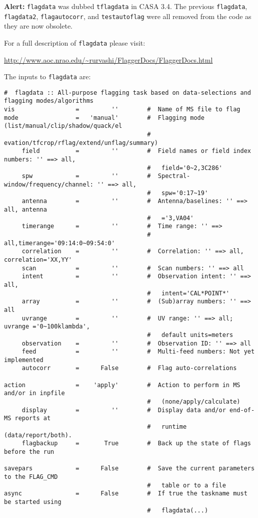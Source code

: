{\bf Alert:} {\tt flagdata} was dubbed {\tt tflagdata} in CASA
3.4. The previous {\tt flagdata}, {\tt flagdata2},
{\tt flagautocorr}, and {\tt testautoflag} were all removed from the
code as they are now obsolete.

For a full description of {\tt flagdata} please visit:

\url{http://www.aoc.nrao.edu/~rurvashi/FlaggerDocs/FlaggerDocs.html}

The inputs to {\tt flagdata} are:

\small
\begin{verbatim}
#  flagdata :: All-purpose flagging task based on data-selections and flagging modes/algorithms
vis                 =         ''        #  Name of MS file to flag
mode                =   'manual'        #  Flagging mode (list/manual/clip/shadow/quack/el
                                        #   evation/tfcrop/rflag/extend/unflag/summary)
     field          =         ''        #  Field names or field index numbers: '' ==> all,
                                        #   field='0~2,3C286'
     spw            =         ''        #  Spectral-window/frequency/channel: '' ==> all,
                                        #   spw='0:17~19'
     antenna        =         ''        #  Antenna/baselines: '' ==> all, antenna
                                        #   ='3,VA04'
     timerange      =         ''        #  Time range: '' ==>
                                        #   all,timerange='09:14:0~09:54:0'
     correlation    =         ''        #  Correlation: '' ==> all, correlation='XX,YY'
     scan           =         ''        #  Scan numbers: '' ==> all
     intent         =         ''        #  Observation intent: '' ==> all,
                                        #   intent='CAL*POINT*'
     array          =         ''        #  (Sub)array numbers: '' ==> all
     uvrange        =         ''        #  UV range: '' ==> all; uvrange ='0~100klambda',
                                        #   default units=meters
     observation    =         ''        #  Observation ID: '' ==> all
     feed           =         ''        #  Multi-feed numbers: Not yet implemented
     autocorr       =      False        #  Flag auto-correlations

action              =    'apply'        #  Action to perform in MS and/or in inpfile
                                        #   (none/apply/calculate)
     display        =         ''        #  Display data and/or end-of-MS reports at
                                        #   runtime (data/report/both).
     flagbackup     =       True        #  Back up the state of flags before the run

savepars            =      False        #  Save the current parameters to the FLAG_CMD
                                        #   table or to a file
async               =      False        #  If true the taskname must be started using
                                        #   flagdata(...)

\end{verbatim}
\normalsize


